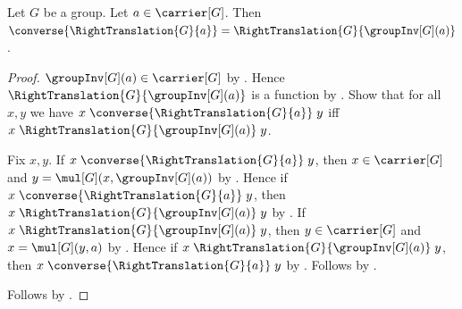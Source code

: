 \begin{lemma}\label{right_translation_converse}
    Let $G$ be a group.
    Let $a\in\carrier[G]$.
    Then $\converse{\RightTranslation{G}{a}}
        =\RightTranslation{G}{\groupInv[G](a)}$.
\end{lemma}
\begin{proof}
    $\groupInv[G](a)\in\carrier[G]$ by .
    Hence $\RightTranslation{G}{\groupInv[G](a)}$ is a function
        by .
    Show that for all $x,y$ we have
        $x\mathrel{\converse{\RightTranslation{G}{a}}}y$ iff
        $x\mathrel{\RightTranslation{G}{\groupInv[G](a)}}y$.
    \begin{subproof}
        Fix $x,y$.
        If $x\mathrel{\converse{\RightTranslation{G}{a}}}y$, then
            $x\in\carrier[G]$ and
            $y=\mul[G](x,\groupInv[G](a))$
            by
            .
        Hence if $x\mathrel{\converse{\RightTranslation{G}{a}}}y$, then
            $x\mathrel{\RightTranslation{G}{\groupInv[G](a)}}y$
            by .
        If $x\mathrel{\RightTranslation{G}{\groupInv[G](a)}}y$, then
            $y\in\carrier[G]$ and $x=\mul[G](y,a)$
            by
            .
        Hence if $x\mathrel{\RightTranslation{G}{\groupInv[G](a)}}y$, then
            $x\mathrel{\converse{\RightTranslation{G}{a}}}y$
            by .
        Follows by \auto.
    \end{subproof}
    Follows by
        .
\end{proof}

